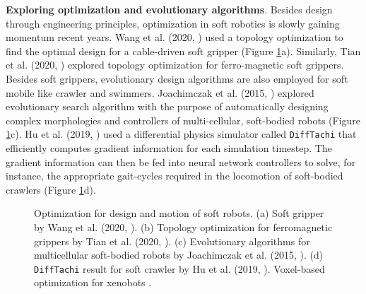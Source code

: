 \textbf{Exploring optimization and evolutionary algorithms}. Besides design through engineering principles, optimization in soft robotics is slowly gaining momentum recent years. Wang et al. (2020, \cite{Wang2020Nov}) used a topology optimization to find the optimal design for a cable-driven soft gripper (Figure \ref{fig:C0:optztypes}a). Similarly, Tian et al. (2020, \cite{Tian2020May}) explored topology optimization for ferro-magnetic soft grippers. Besides soft grippers, evolutionary design algorithms are also employed for soft mobile like crawler and swimmers. Joachimczak et al. (2015, \cite{Joachimczak2014Jul,Joachimczak2015}) explored evolutionary search algorithm with the purpose of automatically designing complex morphologies and controllers of multi-cellular, soft-bodied robots (Figure \ref{fig:C0:optztypes}c). Hu et al. (2019, \cite{Hu2019taichi}) used a differential physics simulator called \texttt{DiffTachi} that efficiently computes gradient information for each simulation timestep. The gradient information can then be fed into neural network controllers to solve, for instance, the appropriate gait-cycles required in the locomotion of soft-bodied crawlers (Figure \ref{fig:C0:optztypes}d).

\begin{figure}[!t]
  \vspace{-3mm}
  \ifx\printFigures\undefined
  \else
  \hspace{2mm}
  \vspace{-6mm}
  \fi
  \caption{Optimization for design and motion of soft robots. (a) Soft gripper by Wang et al. (2020, \cite{Wang2020Nov}). (b) Topology optimization for ferromagnetic grippers by Tian et al. (2020, \cite{Tian2020May}). (c) Evolutionary algorithms for multicellular soft-bodied robots by Joachimczak et al. (2015, \cite{Joachimczak2014Jul,Joachimczak2015}). (d) \texttt{DiffTachi} result for soft crawler by Hu et al. (2019, \cite{Hu2019taichi}). Voxel-based optimization for xenobots \cite{Kriegman2019}.}
  \label{fig:C0:optztypes}
  \vspace{-4mm}
\end{figure}

\vspace{-2mm}
